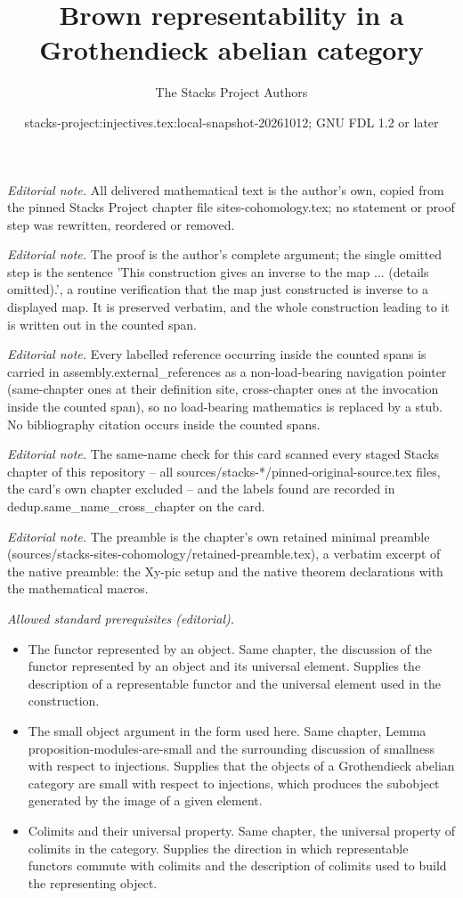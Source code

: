\documentclass[10pt,a4paper]{amsart}
\title{Brown representability in a Grothendieck abelian category}
\author{The Stacks Project Authors}
\date{stacks-project:injectives.tex:local-snapshot-20261012; GNU FDL 1.2 or later}
\theoremstyle{plain}
\theoremstyle{definition}
\theoremstyle{remark}
\numberwithin{equation}{subsection}
\begin{document}
\maketitle
\noindent\textit{Editorial note.} All delivered mathematical text is the author's own, copied from the pinned Stacks Project chapter file sites-cohomology.tex; no statement or proof step was rewritten, reordered or removed.\par\medskip
\noindent\textit{Editorial note.} The proof is the author's complete argument; the single omitted step is the sentence 'This construction gives an inverse to the map ... (details omitted).', a routine verification that the map just constructed is inverse to a displayed map. It is preserved verbatim, and the whole construction leading to it is written out in the counted span.\par\medskip
\noindent\textit{Editorial note.} Every labelled reference occurring inside the counted spans is carried in assembly.external\_references as a non-load-bearing navigation pointer (same-chapter ones at their definition site, cross-chapter ones at the invocation inside the counted span), so no load-bearing mathematics is replaced by a stub. No bibliography citation occurs inside the counted spans.\par\medskip
\noindent\textit{Editorial note.} The same-name check for this card scanned every staged Stacks chapter of this repository -- all sources/stacks-*/pinned-original-source.tex files, the card's own chapter excluded -- and the labels found are recorded in dedup.same\_name\_cross\_chapter on the card.\par\medskip
\noindent\textit{Editorial note.} The preamble is the chapter's own retained minimal preamble (sources/stacks-sites-cohomology/retained-preamble.tex), a verbatim excerpt of the native preamble: the Xy-pic setup and the native theorem declarations with the mathematical macros.\par\medskip
\noindent\textit{Allowed standard prerequisites (editorial).}\begin{itemize}
\item The functor represented by an object. Same chapter, the discussion of the functor represented by an object and its universal element. Supplies the description of a representable functor and the universal element used in the construction.
\item The small object argument in the form used here. Same chapter, Lemma proposition-modules-are-small and the surrounding discussion of smallness with respect to injections. Supplies that the objects of a Grothendieck abelian category are small with respect to injections, which produces the subobject generated by the image of a given element.
\item Colimits and their universal property. Same chapter, the universal property of colimits in the category. Supplies the direction in which representable functors commute with colimits and the description of colimits used to build the representing object.
\end{itemize}\medskip
\end{document}
